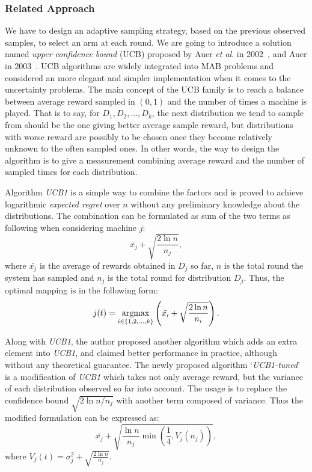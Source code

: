 \subsubsection{Related Approach}

We have to design an adaptive sampling strategy, based on the previous
observed samples, to select an arm at each round.
We are going to introduce a solution named \emph{upper confidence bound}
(UCB) proposed by Auer \textit{et al}. in 2002~\cite{auer2003using}, and Auer in
2003~\cite{auer2002finite}.
UCB algorithms are widely integrated into MAB problems and considered an
more elegant and simpler implementation when it comes to the uncertainty
problems.
The main concept of the UCB family is to reach a balance between average
reward sampled in $(0,1)$ and the number of times a machine is played.
That is to say, for $D_1, D_2, \ldots, D_k$, the next distribution we
tend to sample from should be the one giving better average sample
reward, but distributions with worse reward are possibly to be chosen
once they become relatively unknown to the often sampled ones.
In other words, the way to design the algorithm is to give a measurement
combining average reward and the number of sampled times for each
distribution. 

\newcommand{\argmax}{\operatornamewithlimits{argmax}}

Algorithm \emph{UCB1} is a simple way to combine the factors and is
proved to achieve logarithmic \emph{expected regret} over $n$ without
any preliminary knowledge about the distributions.
The combination can be formulated as sum of the two terms as following
when considering machine $j$: \[\bar{x_j} +
\sqrt{\frac{2\ln{n}}{n_j}},\] where $\bar{x_j}$ is the average of
rewards obtained in $D_j$ so far, $n$ is the total round the system has
sampled and $n_j$ is the total round for distribution $D_j$.
Thus, the optimal mapping is in the following form: \[j(t) =
  \argmax\limits_{i
\in \{1,2,\ldots,k\}}\left(\bar{x_i} + \sqrt{\frac{2\ln{n}}{n_i}}\right).\]

Along with \emph{UCB1}, the author proposed another algorithm which adds
an extra element into \emph{UCB1}, and claimed better performance in
practice, although without any theoretical guarantee.
The newly proposed algorithm `\emph{UCB1-tuned}' is a modification of
\emph{UCB1} which takes not only average reward, but the variance of
each distribution observed so far into account.
The usage is to replace the confidence bound
\emph{$\sqrt{2\ln{n}/{n_j}}$} with another term composed of variance.
Thus the modified formulation can be expressed as:
\[\bar{x_j} + \sqrt{\frac{\ln{n}}{n_j} \min(\frac{1}{4},V_j(n_j))},\]
where $V_j(t) =\sigma_j^2 + \sqrt{\frac{2\ln n}{n_j}}$.

